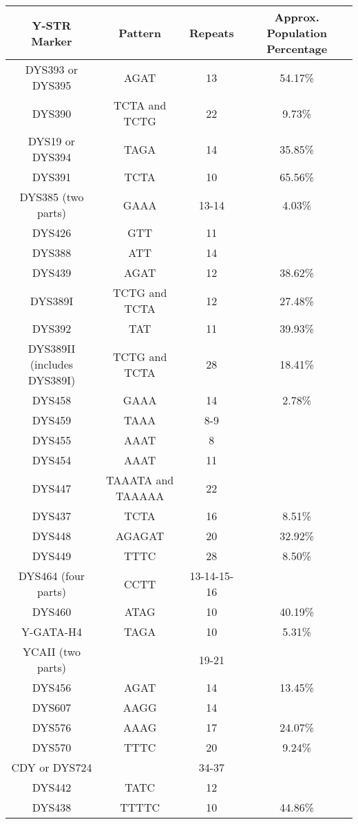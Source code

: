 \documentclass[11pt,letter]{book}
\begin{document}
\begin{center}
\begin{tabular}{c | c | c | c}
	Y-STR Marker & Pattern & Repeats & Approx. Population Percentage\endnote{yhrd.org accessed in 2018} \\
	\hline
	DYS393 or DYS395 & AGAT & 13 & 54.17\% \\
	DYS390 & TCTA and TCTG & 22 & 9.73\% \\
	DYS19 or DYS394 & TAGA & 14 & 35.85\% \\
	DYS391 & TCTA & 10 & 65.56\% \\
	DYS385 (two parts) & GAAA & 13-14 & 4.03\% \\
	DYS426 & GTT & 11 & \\
	DYS388 & ATT & 14 & \\
	DYS439 & AGAT & 12 & 38.62\% \\
	DYS389I & TCTG and TCTA & 12 & 27.48\% \\
	DYS392 & TAT & 11 & 39.93\% \\
	DYS389II (includes DYS389I) & TCTG and TCTA & 28 & 18.41\% \\
	DYS458 & GAAA & 14 & 2.78\% \\
	DYS459 & TAAA & 8-9 & \\
	DYS455 & AAAT & 8 & \\
	DYS454 & AAAT & 11 & \\
	DYS447 & TAAATA and TAAAAA & 22 & \\
	DYS437 & TCTA & 16 & 8.51\%  \\
	DYS448 & AGAGAT & 20 & 32.92\% \\
	DYS449 & TTTC & 28 & 8.50\% \\
	DYS464 (four parts) & CCTT & 13-14-15-16 & \\
	DYS460 & ATAG & 10 & 40.19\% \\
	Y-GATA-H4 & TAGA & 10 & 5.31\% \\
	YCAII (two parts) & & 19-21 & \\
	DYS456 & AGAT & 14 & 13.45\% \\
	DYS607 & AAGG & 14 & \\
	DYS576 & AAAG & 17 & 24.07\% \\
	DYS570 & TTTC & 20 & 9.24\%\\
	CDY or DYS724 & & 34-37 & \\
	DYS442 & TATC & 12 & \\
	DYS438 & TTTTC & 10 & 44.86\% \\
\end{tabular}
\end{center}
\end{document}
